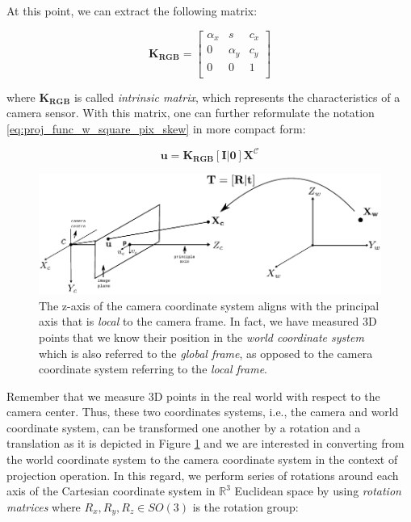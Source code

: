 \documentclass[a4paper]{report}
\numberwithin{figure}{section}
\newcommand{\R}{\mathbb{R}}
\begin{document}
At this point, we can extract the following matrix:

\begin{equation}
  \mathbf{K_{RGB}} = 
  \begin{bmatrix}
    \alpha_x & s & c_x\\
    0 & \alpha_y & c_y\\
    0 & 0 & 1\\
  \end{bmatrix}\label{eq:k_matrix}
\end{equation} 

where $\mathbf{K_{RGB}}$ is called \textit{intrinsic matrix}, which represents 
the characteristics of a camera sensor.  With this matrix, one can further 
reformulate the notation \eqref{eq:proj_func_w_square_pix_skew} in more 
compact 
form:

\begin{equation}\label{eq:simplyfied_proj_func}
  \mathbf{u} = \mathbf{K_{RGB}}[\mathbf{I}|\mathbf{0}]\mathbf{X^{\mathcal{C}}}
\end{equation} 

\begin{figure}[H]
	\centering
  \includegraphics[width=\linewidth,natwidth=640,natheight=640]
  {fig/drawings/pinhole_world_to_cam.pdf}
  \caption[Extrinsic Matrix]{The z-axis of the camera coordinate system aligns 
  with the principal axis that is \textit{local} to the camera frame. In fact, 
  we 
  have measured 3D points that we know their position in the \textit{world 
  coordinate system} which is also referred to the \textit{global frame}, as 
  opposed to the camera coordinate system referring to the 
\textit{local frame}.}
  \label{fig:cam_model_rot_trans}
\end{figure}

Remember that we measure 3D points in the real world with respect to the 
camera center.  Thus, these two coordinates systems, i.e., the camera and 
world coordinate system, can be transformed one another by a rotation and a 
translation as it is depicted in Figure \ref{fig:cam_model_rot_trans} and we 
are interested in converting from the world coordinate system to the camera 
coordinate system in the context of projection operation.  In this regard, we 
perform series of rotations around each axis of the Cartesian coordinate 
system in $\R^3$ Euclidean space by using \textit{rotation matrices} where 
$R_x, R_y, R_z \in SO(3)$ is the rotation group:
\end{document}
